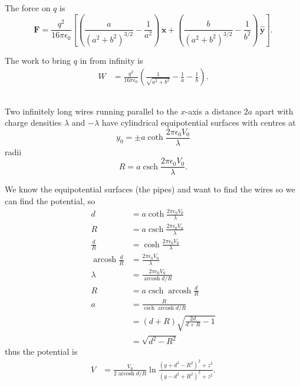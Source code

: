 \documentclass{article}
\DeclareMathOperator{\arcosh}{arcosh}
\DeclareMathOperator{\csch}{csch}
\renewcommand{\vec}[1]{\boldsymbol{\mathbf{#1}}}
\newcommand{\uvec}[1]{\hat{\vec{#1}}}
\begin{document}
The force on $q$ is \[\vec{F} = \frac{q^2}{16 \pi \epsilon_0} \left[ \left( \frac{a}{(a^2 + b^2)^{3 / 2}} - \frac{1}{a^2} \right) \,\uvec{x} + \left( \frac{b}{(a^2 + b^2)^{3 / 2}} - \frac{1}{b^2} \right) \,\uvec{y} \right].\]

The work to bring $q$ in from infinity is \begin{align*}
  W & = \frac{q^2}{16 \pi \epsilon_0} \left( \frac{1}{\sqrt{a^2 + b^2}} - \frac{1}{a} - \frac{1}{b} \right).
\end{align*}

\subsection{}

Two infinitely long wires running parallel to the $x$-axis a distance $2 a$ apart with charge densities $\lambda$ and $-\lambda$ have cylindrical equipotential surfaces with centres at \[y_0 = \pm a \coth \frac{2 \pi \epsilon_0 V_0}{\lambda}\] radii \[R = a \csch \frac{2 \pi \epsilon_0 V_0}{\lambda}.\]

We know the equipotential surfaces (the pipes) and want to find the wires so we can find the potential, so \begin{align*}
  d                   & = a \coth \frac{2 \pi \epsilon_0 V_0}{\lambda} \\
  R                   & = a \csch \frac{2 \pi \epsilon_0 V_0}{\lambda} \\
  \frac{d}{R}         & = \cosh \frac{2 \pi \epsilon_0 V_0}{\lambda}   \\
  \arcosh \frac{d}{R} & = \frac{2 \pi \epsilon_0 V_0}{\lambda}         \\
  \lambda             & = \frac{2 \pi \epsilon_0 V_0}{\arcosh d / R}   \\
  R                   & = a \csch \arcosh \frac{d}{R}                  \\
  a                   & = \frac{R}{\csch \arcosh d / R}                \\
                      & = (d + R) \sqrt{\frac{2 d}{d + R} - 1}         \\
                      & = \sqrt{d^2 - R^2}
\end{align*} thus the potential is \begin{align*}
  V & = \frac{V_0}{2 \arcosh d / R} \ln \frac{(y + d^2 - R^2)^2 + z^2}{(y - d^2 + R^2)^2 + z^2}.
\end{align*}

\subsection{}
\end{document}
